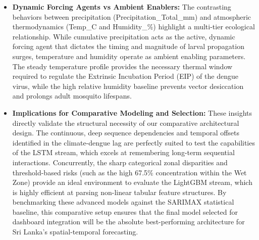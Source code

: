 \documentclass[12pt,a4paper]{article}
\begin{document}
\begin{itemize}
    \setlength{\itemsep}{1em}
    \item \textbf{Dynamic Forcing Agents vs Ambient Enablers:} The contrasting behaviors between precipitation (Precipitation\_Total\_mm) and atmospheric thermodynamics (Temp\_C and Humidity\_\%) highlight a multi-tier ecological relationship. While cumulative precipitation acts as the active, dynamic forcing agent that dictates the timing and magnitude of larval propagation surges, temperature and humidity operate as ambient enabling parameters. The steady temperature profile provides the necessary thermal window required to regulate the Extrinsic Incubation Period (EIP) of the dengue virus, while the high relative humidity baseline prevents vector desiccation and prolongs adult mosquito lifespans.
    \item \textbf{Implications for Comparative Modeling and Selection:} These insights directly validate the structural necessity of our comparative architectural design. The continuous, deep sequence dependencies and temporal offsets identified in the climate-dengue lag are perfectly suited to test the capabilities of the LSTM stream, which excels at remembering long-term sequential interactions. Concurrently, the sharp categorical zonal disparities and threshold-based risks (such as the high 67.5\% concentration within the Wet Zone) provide an ideal environment to evaluate the LightGBM stream, which is highly efficient at parsing non-linear tabular feature structures. By benchmarking these advanced models against the SARIMAX statistical baseline, this comparative setup ensures that the final model selected for dashboard integration will be the absolute best-performing architecture for Sri Lanka's spatial-temporal forecasting.
\end{itemize}

\newpage
\nocite{*}
\printbibliography
\end{document}
